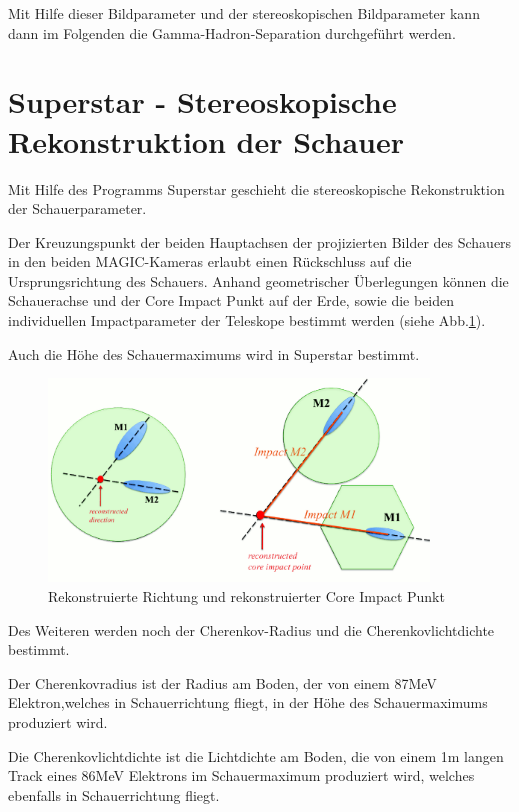 Mit Hilfe dieser Bildparameter und der stereoskopischen Bildparameter kann dann im Folgenden die Gamma-Hadron-Separation durchgeführt werden.


\section{Superstar - Stereoskopische Rekonstruktion der Schauer}
Mit Hilfe des Programms Superstar geschieht die stereoskopische Rekonstruktion der Schauerparameter.

Der Kreuzungspunkt der beiden Hauptachsen der projizierten Bilder des Schauers in den beiden MAGIC-Kameras erlaubt einen Rückschluss auf die Ursprungsrichtung des Schauers.
Anhand geometrischer Überlegungen können die Schauerachse und der Core Impact Punkt auf der Erde, sowie die beiden individuellen Impactparameter der Teleskope bestimmt werden (siehe Abb.\ref{Superstar}).

Auch die Höhe des Schauermaximums wird in Superstar bestimmt.

\begin{figure}
    \centering
    \includegraphics[width=0.9\textwidth]{./Plots/Superstar.png}
    \caption{Rekonstruierte Richtung und rekonstruierter Core Impact Punkt}
    \label{Superstar}
\end{figure}

Des Weiteren werden noch der Cherenkov-Radius und die Cherenkovlichtdichte bestimmt.

Der Cherenkovradius ist der Radius am Boden, der von einem 87MeV Elektron,welches in Schauerrichtung fliegt, in der Höhe des Schauermaximums produziert wird.

Die Cherenkovlichtdichte ist die Lichtdichte am Boden, die von einem 1m langen Track eines 86MeV Elektrons im Schauermaximum produziert wird, welches ebenfalls in Schauerrichtung fliegt.


